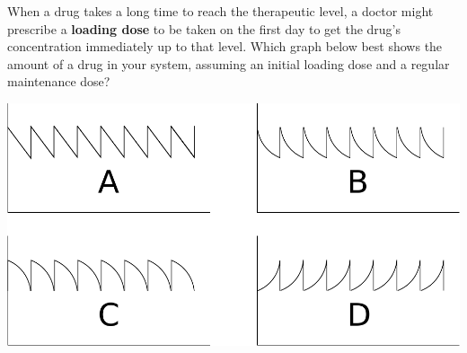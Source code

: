 \documentclass[space,handout]{ximera}
\begin{document}
\begin{question}
When a drug takes a long time to reach the therapeutic level, a doctor
might prescribe a \textbf{loading dose} to be taken on the first day
to get the drug's concentration immediately up to that level. Which
graph below best shows the amount of a drug in your system, assuming
an initial loading dose and a regular maintenance dose?
\begin{image}
  \includegraphics{plots.pdf}
\end{image}
\begin{multipleChoice}
\end{multipleChoice}
\end{question}



\end{document}
